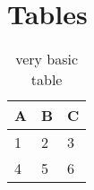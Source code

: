 \section{Tables}\label{sec:Elements_tables}
\begin{table}[ht]
	\centering
	\begin{tabular}{l | l | l}
	A & B & C \\
	\hline
	1 & 2 & 3 \\
	4 & 5 & 6
	\end{tabular}
	\caption{very basic table}
	\label{tab:abc}
\end{table}
%
